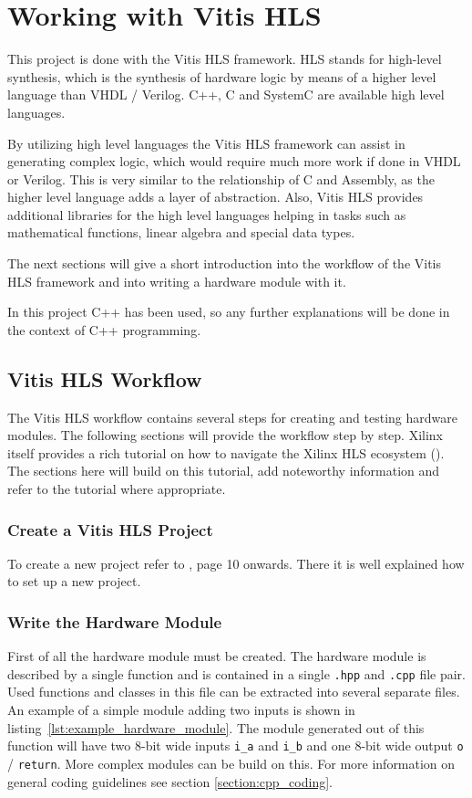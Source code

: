 \section{Working with Vitis HLS}
This project is done with the Vitis HLS framework. HLS stands for high-level synthesis, which is the synthesis of hardware logic by means of a higher level language than VHDL / Verilog. C++, C and SystemC are available high level languages.

By utilizing high level languages the Vitis HLS framework can assist in generating complex logic, which would require much more work if done in VHDL or Verilog. This is very similar to the relationship of C and Assembly, as the higher level language adds a layer of abstraction. Also, Vitis HLS provides additional libraries for the high level languages helping in tasks such as mathematical functions, linear algebra and special data types.

The next sections will give a short introduction into the workflow of the Vitis HLS framework and into writing a hardware module with it.

In this project C++ has been used, so any further explanations will be done in the context of C++ programming.

\subsection{Vitis HLS Workflow}
The Vitis HLS workflow contains several steps for creating and testing hardware modules. The following sections will provide the workflow step by step. Xilinx itself provides a rich tutorial on how to navigate the Xilinx HLS ecosystem (\cite{xilinx:hls_tutorial}). The sections here will build on this tutorial, add noteworthy information and refer to the tutorial where appropriate.

\subsubsection{Create a Vitis HLS Project}
To create a new project refer to \cite{xilinx:hls_tutorial}, page 10 onwards. There it is well explained how to set up a new project.

\subsubsection{Write the Hardware Module}
First of all the hardware module must be created. The hardware module is described by a single function and is contained in a single \texttt{.hpp} and \texttt{.cpp} file pair. Used functions and classes in this file can be extracted into several separate files. An example of a simple module adding two inputs is shown in listing~\ref{lst:example_hardware_module}. The module generated out of this function will have two 8-bit wide inputs \texttt{i\_a} and \texttt{i\_b} and one 8-bit wide output \texttt{o} / \texttt{return}. More complex modules can be build on this. For more information on general coding guidelines see section \ref{section:cpp_coding}.


